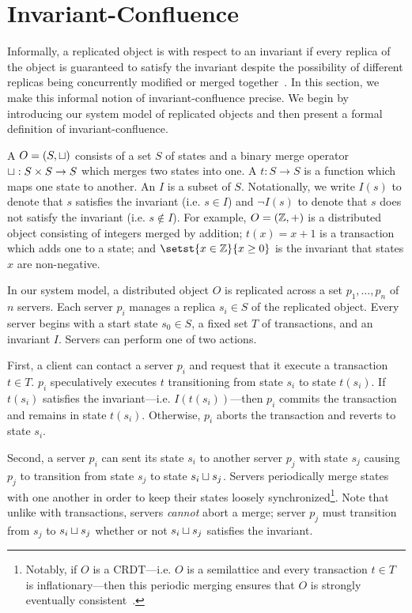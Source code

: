 \section{Invariant-Confluence}
Informally, a replicated object is  with respect
to an invariant if every replica of the object is guaranteed to satisfy the
invariant despite the possibility of different replicas being concurrently
modified or merged together~\cite{bailis2014coordination}. In this section, we
make this informal notion of invariant-confluence precise. We begin by
introducing our system model of replicated objects and then present a formal
definition of invariant-confluence.

A  $O = (S, \sqcup)$ consists of a set $S$ of
states and a binary merge operator $\sqcup: S \times S \to S$ which merges two
states into one. A  $t: S \to S$ is a function which maps
one state to another. An  $I$ is a subset of $S$.
Notationally, we write $I(s)$ to denote that $s$ satisfies the invariant (i.e.
$s \in I$) and $\lnot I(s)$ to denote that $s$ does not satisfy the invariant
(i.e. $s \notin I$).
%
For example, $O = (\mathbb{Z}, +)$ is a distributed object consisting of integers
merged by addition; $t(x) = x + 1$ is a transaction which adds one to a state;
and $\setst{x \in \ints}{x \geq 0}$ is the invariant that states $x$ are
non-negative.

In our system model, a distributed object $O$ is replicated across a set $p_1,
\ldots, p_n$ of $n$ servers. Each server $p_i$ manages a replica $s_i \in S$ of
the replicated object. Every server begins with a start state $s_0 \in S$, a
fixed set $T$ of transactions, and an invariant $I$. Servers can perform one of
two actions.

First, a client can contact a server $p_i$ and request that it execute a
transaction $t \in T$. $p_i$ speculatively executes $t$ transitioning from
state $s_i$ to state $t(s_i)$. If $t(s_i)$ satisfies the invariant---i.e.
$I(t(s_i))$---then $p_i$ commits the transaction and remains in state $t(s_i)$.
Otherwise, $p_i$ aborts the transaction and reverts to state $s_i$.

Second, a server $p_i$ can sent its state $s_i$ to another server $p_j$ with
state $s_j$ causing $p_j$ to transition from state $s_j$  to state $s_i \sqcup
s_j$. Servers periodically merge states with one another in order to keep their
states loosely synchronized\footnote{%
  Notably, if $O$ is a CRDT---i.e. $O$ is a semilattice and every transaction
  $t \in T$ is inflationary---then this periodic merging ensures that $O$ is
  strongly eventually consistent~\cite{shapiro2011conflict}.
}.
Note that unlike with transactions, servers \emph{cannot} abort a merge; server
$p_j$ must transition from $s_j$ to $s_i \sqcup s_j$ whether or not $s_i \sqcup
s_j$ satisfies the invariant.

